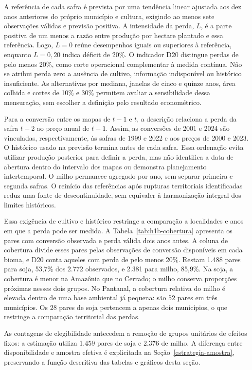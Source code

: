 A referência de cada safra é prevista por uma tendência linear ajustada aos dez anos anteriores do próprio município e cultura, exigindo ao menos sete observações válidas e previsão positiva. A intensidade da perda, $L$, é a parte positiva de um menos a razão entre produção por hectare plantado e essa referência. Logo, $L=0$ reúne desempenhos iguais ou superiores à referência, enquanto $L=0{,}20$ indica déficit de 20\%. O indicador D20 distingue perdas de pelo menos 20\%, como corte operacional complementar à medida contínua. Não se atribui perda zero a ausência de cultivo, informação indisponível ou histórico insuficiente. As alternativas por mediana, janelas de cinco e quinze anos, área colhida e cortes de 10\% e 30\% permitem avaliar a sensibilidade dessa mensuração, sem escolher a definição pelo resultado econométrico.

Para a conversão entre os mapas de $t-1$ e $t$, a descrição relaciona a perda da safra $t-2$ ao preço anual de $t-1$. Assim, as conversões de 2001 e 2024 são vinculadas, respectivamente, às safras de 1999 e 2022 e aos preços de 2000 e 2023. O histórico usado na previsão termina antes de cada safra. Essa ordenação evita utilizar produção posterior para definir a perda, mas não identifica a data de abertura dentro do intervalo dos mapas ou demonstra planejamento intertemporal. O milho permanece agregado por ano, sem separar primeira e segunda safras. O reinício das referências após rupturas territoriais identificadas reduz uma fonte de descontinuidade, sem equivaler à harmonização integral dos limites históricos.

Essa exigência de cultivo e histórico restringe a comparação a localidades e anos em que a perda pode ser medida. A Tabela~\ref{tab:h1b-cobertura} apresenta os pares com conversão observada e perda válida dois anos antes. A coluna de cobertura divide esses pares pelas observações de conversão disponíveis em cada bioma, e D20 conta aqueles com perda de pelo menos 20\%. Restam 1.488 pares para soja, 53,7\% dos 2.772 observados, e 2.381 para milho, 85,9\%. Na soja, a cobertura é menor na Amazônia que no Cerrado; o milho conserva proporções próximas nesses dois grupos. No Pantanal, a cobertura relativa do milho é elevada dentro de uma base ambiental já pequena: são 52 pares em três municípios. Os 28 pares de soja pertencem a apenas dois municípios, o que restringe a comparação territorial das perdas.


\FloatBarrier

As contagens de elegibilidade antecedem a remoção de grupos unitários de efeitos fixos: a estimação utiliza 1.459 pares de soja e 2.376 de milho. A diferença entre disponibilidade e amostra efetiva é explicitada na Seção~\ref{estrategia-amostra}, preservando a função descritiva das tabelas e gráficos desta seção.


